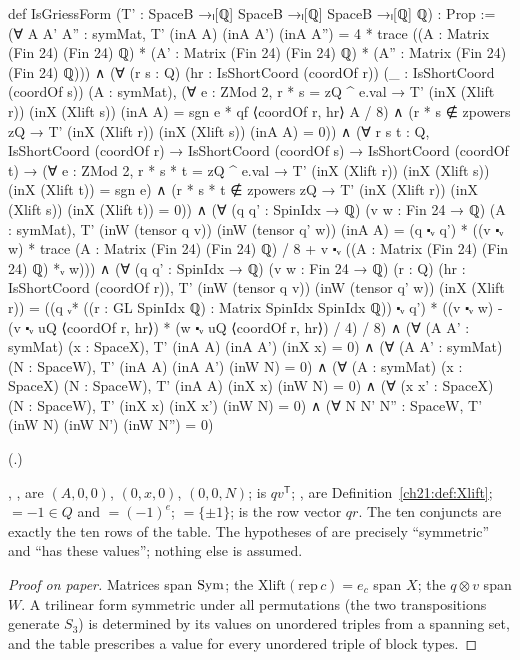 \begin{leancode}
def IsGriessForm (T' : SpaceB →ₗ[ℚ] SpaceB →ₗ[ℚ] SpaceB →ₗ[ℚ] ℚ) : Prop :=
  (∀ A A' A'' : symMat, T' (inA A) (inA A') (inA A'') =
    4 * trace ((A : Matrix (Fin 24) (Fin 24) ℚ) * (A' : Matrix (Fin 24) (Fin 24) ℚ) *
      (A'' : Matrix (Fin 24) (Fin 24) ℚ))) ∧
  (∀ (r s : Q) (hr : IsShortCoord (coordOf r)) (_ : IsShortCoord (coordOf s)) (A : symMat),
    (∀ e : ZMod 2, r * s = zQ ^ e.val →
      T' (inX (Xlift r)) (inX (Xlift s)) (inA A) = sgn e * qf ⟨coordOf r, hr⟩ A / 8) ∧
    (r * s ∉ zpowers zQ → T' (inX (Xlift r)) (inX (Xlift s)) (inA A) = 0)) ∧
  (∀ r s t : Q, IsShortCoord (coordOf r) → IsShortCoord (coordOf s) →
    IsShortCoord (coordOf t) →
    (∀ e : ZMod 2, r * s * t = zQ ^ e.val →
      T' (inX (Xlift r)) (inX (Xlift s)) (inX (Xlift t)) = sgn e) ∧
    (r * s * t ∉ zpowers zQ → T' (inX (Xlift r)) (inX (Xlift s)) (inX (Xlift t)) = 0)) ∧
  (∀ (q q' : SpinIdx → ℚ) (v w : Fin 24 → ℚ) (A : symMat),
    T' (inW (tensor q v)) (inW (tensor q' w)) (inA A) =
      (q ⬝ᵥ q') * ((v ⬝ᵥ w) * trace (A : Matrix (Fin 24) (Fin 24) ℚ) / 8 +
        v ⬝ᵥ ((A : Matrix (Fin 24) (Fin 24) ℚ) *ᵥ w))) ∧
  (∀ (q q' : SpinIdx → ℚ) (v w : Fin 24 → ℚ) (r : Q) (hr : IsShortCoord (coordOf r)),
    T' (inW (tensor q v)) (inW (tensor q' w)) (inX (Xlift r)) =
      ((q ᵥ* ((r : GL SpinIdx ℚ) : Matrix SpinIdx SpinIdx ℚ)) ⬝ᵥ q') *
        ((v ⬝ᵥ w) - (v ⬝ᵥ uQ ⟨coordOf r, hr⟩) * (w ⬝ᵥ uQ ⟨coordOf r, hr⟩) / 4) / 8) ∧
  (∀ (A A' : symMat) (x : SpaceX), T' (inA A) (inA A') (inX x) = 0) ∧
  (∀ (A A' : symMat) (N : SpaceW), T' (inA A) (inA A') (inW N) = 0) ∧
  (∀ (A : symMat) (x : SpaceX) (N : SpaceW), T' (inA A) (inX x) (inW N) = 0) ∧
  (∀ (x x' : SpaceX) (N : SpaceW), T' (inX x) (inX x') (inW N) = 0) ∧
  (∀ N N' N'' : SpaceW, T' (inW N) (inW N') (inW N'') = 0)
\end{leancode}
(.)
\begin{dictionary}
, ,  are $(A,0,0)$, $(0,x,0)$, $(0,0,N)$;  is
$qv^{\mathsf T}$; ,  are Definition~\ref{ch21:def:Xlift};  $=-1\in Q$
and  $=(-1)^e$;  $=\{\pm1\}$;  is the row vector $qr$.  The
ten conjuncts are exactly the ten rows of the table.  The hypotheses of  are precisely
``symmetric'' and ``has these values''; nothing else is assumed.
\end{dictionary}
\begin{proof}[Proof on paper]
Matrices span $\mathrm{Sym}$; the $\mathrm{Xlift}(\mathrm{rep}\,c)=e_c$ span $X$; the $q\otimes v$ span $W$.
A trilinear form symmetric under all permutations (the two transpositions generate $S_3$) is determined
by its values on unordered triples from a spanning set, and the table prescribes a value for every
unordered triple of block types.
\end{proof}
